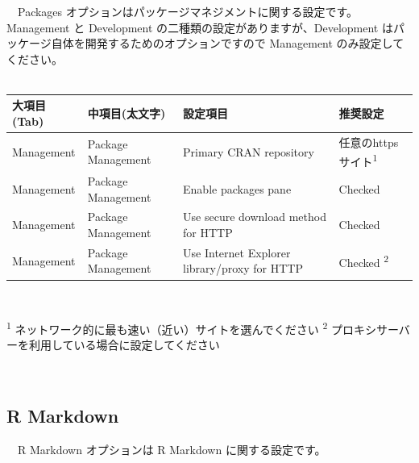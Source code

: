 \documentclass[
  12pt,
]{book}
\begin{document}
　Packages オプションはパッケージマネジメントに関する設定です。 Management と Development の二種類の設定がありますが、Development はパッケージ自体を開発するためのオプションですので Management のみ設定してください。\\
　

\begin{longtable}[]{@{}
  >{\raggedright\arraybackslash}p{}
  >{\raggedright\arraybackslash}p{}
  >{\raggedright\arraybackslash}p{}
  >{\raggedright\arraybackslash}p{}@{}}
\toprule
大項目(Tab) & 中項目(太文字) & 設定項目 & 推奨設定 \\
\midrule
\endhead
Management & Package Management & Primary CRAN repository & 任意のhttpsサイト\textsuperscript{1} \\
Management & Package Management & Enable packages pane & Checked \\
Management & Package Management & Use secure download method for HTTP & Checked \\
Management & Package Management & Use Internet Explorer library/proxy for HTTP & Checked \textsuperscript{2} \\
\bottomrule
\end{longtable}

　

\textsuperscript{1} ネットワーク的に最も速い（近い）サイトを選んでください \textsuperscript{2} プロキシサーバーを利用している場合に設定してください

　

\hypertarget{r-markdown-1}{%
\subsection{R Markdown}\label{r-markdown-1}}

　R Markdown オプションは R Markdown に関する設定です。
\end{document}
